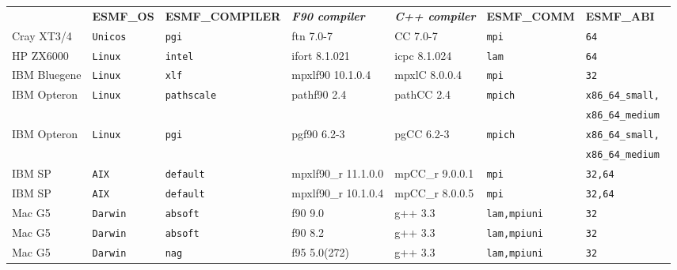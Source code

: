 \begin{tabular}{lllllll}
  &{\bfseries\footnotesize ESMF\_OS} &{\bfseries\footnotesize ESMF\_COMPILER} & {\bfseries\footnotesize\it F90 compiler} & {\bfseries\footnotesize\it C++ compiler} & {\bfseries\footnotesize ESMF\_COMM} & {\bfseries\footnotesize ESMF\_ABI} \\

Cray XT3/4      &\tt Unicos &\tt pgi     & ftn \footnotesize 7.0-7   & CC \footnotesize 7.0-7 &\tt mpi &\tt 64 \\
HP ZX6000       &\tt Linux  &\tt intel   & ifort \footnotesize 8.1.021 & icpc \footnotesize 8.1.024 &\tt lam &\tt 64 \\
IBM Bluegene    &\tt Linux  &\tt xlf     & mpxlf90 \footnotesize 10.1.0.4 & mpxlC \footnotesize 8.0.0.4 &\tt mpi &\tt 32 \\
IBM Opteron     &\tt Linux  &\tt pathscale & pathf90 \footnotesize 2.4 & pathCC \footnotesize 2.4 &\tt mpich &\tt x86\_64\_small, \\
                &           &              &                           &                          &          &\tt x86\_64\_medium \\
IBM Opteron     &\tt Linux  &\tt pgi     & pgf90 \footnotesize 6.2-3 & pgCC \footnotesize 6.2-3 &\tt mpich   &\tt x86\_64\_small, \\
                &           &            &                           &                          &            &\tt x86\_64\_medium \\
IBM SP          &\tt AIX    &\tt default & mpxlf90\_r \footnotesize 11.1.0.0 & mpCC\_r \footnotesize 9.0.0.1 &\tt mpi &\tt 32,64 \\
IBM SP          &\tt AIX    &\tt default & mpxlf90\_r \footnotesize 10.1.0.4 & mpCC\_r \footnotesize 8.0.0.5 &\tt mpi &\tt 32,64 \\
Mac G5          &\tt Darwin &\tt absoft  & f90 \footnotesize 9.0     & g++ \footnotesize 3.3    &\tt lam,mpiuni &\tt 32 \\
Mac G5          &\tt Darwin &\tt absoft  & f90 \footnotesize 8.2     & g++ \footnotesize 3.3    &\tt lam,mpiuni &\tt 32 \\
Mac G5          &\tt Darwin &\tt nag     & f95 \footnotesize 5.0(272)& g++ \footnotesize 3.3    &\tt lam,mpiuni &\tt 32 \\

\end{tabular}
